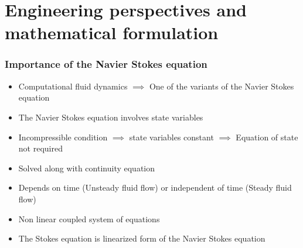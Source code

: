 \documentclass{beamer}
\begin{document}
\section{Engineering perspectives and mathematical formulation} %
\begin{frame}
\frametitle{Importance of the Navier Stokes equation}
\begin{itemize}

\item Computational fluid dynamics $\implies$ One of the variants of the Navier Stokes equation
\item The Navier Stokes equation involves state variables
\item Incompressible condition $\implies$ state variables constant $\implies$ Equation of state not required
\item Solved along with continuity equation
\item Depends on time (Unsteady fluid flow) or independent of time (Steady fluid flow)
\item Non linear coupled system of equations
\item The Stokes equation is linearized form of the Navier Stokes equation

\end{itemize}

\end{frame}
\end{document}
